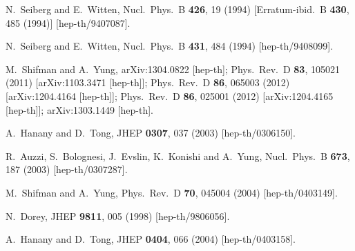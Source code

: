 \documentclass[12pt]{article}
\begin{document}
\begin{thebibliography}{99}
  N.~Seiberg and E.~Witten,
  Nucl.\ Phys.\ B {\bf 426}, 19 (1994)
  [Erratum-ibid.\ B {\bf 430}, 485 (1994)]
  [hep-th/9407087].

  N.~Seiberg and E.~Witten,
  Nucl.\ Phys.\ B {\bf 431}, 484 (1994)
  [hep-th/9408099].

  M.~Shifman and A.~Yung,
  arXiv:1304.0822 [hep-th];
  Phys.\ Rev.\ D {\bf 83}, 105021 (2011)
  [arXiv:1103.3471 [hep-th]];
  Phys.\ Rev.\ D {\bf 86}, 065003 (2012)
  [arXiv:1204.4164 [hep-th]];
  Phys.\ Rev.\ D {\bf 86}, 025001 (2012)
  [arXiv:1204.4165 [hep-th]];
  arXiv:1303.1449 [hep-th].
  
  A.~Hanany and D.~Tong,
  JHEP {\bf 0307}, 037 (2003)
  [hep-th/0306150].

  R.~Auzzi, S.~Bolognesi, J.~Evslin, K.~Konishi and A.~Yung,
  Nucl.\ Phys.\ B {\bf 673}, 187 (2003)
  [hep-th/0307287].

  M.~Shifman and A.~Yung,
  Phys.\ Rev.\ D {\bf 70}, 045004 (2004)
  [hep-th/0403149].

  N.~Dorey,
  JHEP {\bf 9811}, 005 (1998)
  [hep-th/9806056].

  A.~Hanany and D.~Tong,
  JHEP {\bf 0404}, 066 (2004)
  [hep-th/0403158].


\end{thebibliography}
\end{document}
